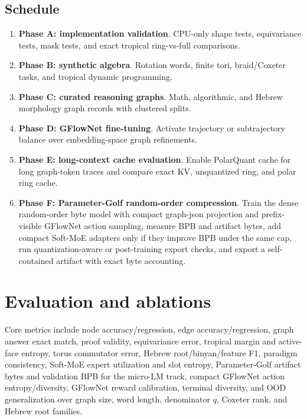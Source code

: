 \documentclass[11pt]{article}
\theoremstyle{definition}
\theoremstyle{plain}
\theoremstyle{remark}
\numberwithin{equation}{section}
\begin{document}
\subsection{Schedule}

\begin{enumerate}[leftmargin=2em]
  \item \textbf{Phase A: implementation validation}.  CPU-only shape tests, equivariance tests, mask tests, and exact tropical ring-vs-full comparisons.
  \item \textbf{Phase B: synthetic algebra}.  Rotation words, finite tori, braid/Coxeter tasks, and tropical dynamic programming.
  \item \textbf{Phase C: curated reasoning graphs}.  Math, algorithmic, and Hebrew morphology graph records with clustered splits.
  \item \textbf{Phase D: GFlowNet fine-tuning}.  Activate trajectory or subtrajectory balance over embedding-space graph refinements.
  \item \textbf{Phase E: long-context cache evaluation}.  Enable PolarQuant cache for long graph-token traces and compare exact KV, unquantized ring, and polar ring cache.
  \item \textbf{Phase F: Parameter-Golf random-order compression}.  Train the dense random-order byte model with compact graph-json projection and prefix-visible GFlowNet action sampling, measure BPB and artifact bytes, add compact Soft-MoE adapters only if they improve BPB under the same cap, run quantization-aware or post-training export checks, and export a self-contained artifact with exact byte accounting.
\end{enumerate}

\section{Evaluation and ablations}

Core metrics include node accuracy/regression, edge accuracy/regression, graph answer exact match, proof validity, equivariance error, tropical margin and active-face entropy, torus commutator error, Hebrew root/binyan/feature F1, paradigm consistency, Soft-MoE expert utilization and slot entropy, Parameter-Golf artifact bytes and validation BPB for the micro-LM track, compact GFlowNet action entropy/diversity, GFlowNet reward calibration, terminal diversity, and OOD generalization over graph size, word length, denominator $q$, Coxeter rank, and Hebrew root families.
\end{document}
